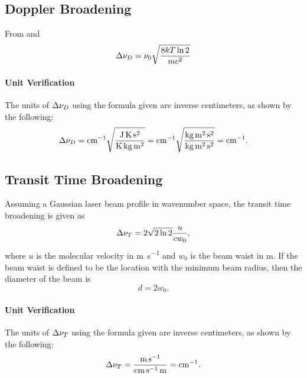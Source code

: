 \subsection{Doppler Broadening}

From \cite[55]{foxStudentsGuideAtomic2018} and \cite[138]{hansonSpectroscopyOpticalDiagnostics2016}
\begin{equation*}
    \adif{\nu}_D = \nu_0\sqrt{\frac{8kT\ln{2}}{mc^2}}
\end{equation*}

\paragraph{Unit Verification}

The units of $\adif{\nu}_D$ using the formula given are inverse centimeters, as shown by the following:
\begin{equation*}
    \adif{\nu}_D = \unit{cm^{-1}}\sqrt{\frac{\unit{J.K.s^2}}{\unit{K.kg.m^2}}} = \unit{cm^{-1}}\sqrt{\frac{\unit{kg.m^2.s^2}}{\unit{kg.m^2.s^2}}} = \unit{cm^{-1}}.
\end{equation*}

\subsection{Transit Time Broadening}

Assuming a Gaussian laser beam profile in wavenumber space, the transit time broadening is given as \cite[86]{demtroderLaserSpectroscopy2008}
\begin{equation*}
    \adif{\nu}_T = 2\sqrt{2\ln{2}}\frac{u}{cw_0},
\end{equation*}
where $u$ is the molecular velocity in \unit{m.s^{-1}} and $w_0$ is the beam waist in \unit{m}.
If the beam waist is defined to be the location with the minimum beam radius, then the diameter of the beam is
\begin{equation*}
    d = 2w_0.
\end{equation*}

\paragraph{Unit Verification}

The units of $\adif{\nu}_T$ using the formula given are inverse centimeters, as shown by the following:
\begin{equation*}
    \adif{\nu}_T = \frac{\unit{m.s^{-1}}}{\unit{cm.s^{-1}.m}} = \unit{cm^{-1}}.
\end{equation*}
